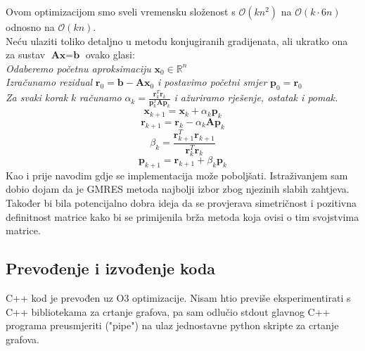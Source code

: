 \documentclass[zavrsnirad]{../fer}
\begin{document}
Ovom optimizacijom smo sveli vremensku složenost s 
$\mathcal{O}(k n^2)$ na $\mathcal{O}(k \cdot 6n)$ odnosno na $\mathcal{O}(k n)$.
\bigskip
\\
Neću ulaziti toliko detaljno u metodu konjugiranih gradijenata, 
ali ukratko ona za sustav $\textbf{A}\textbf{x} = \textbf{b}$ ovako glasi: 
\\ 
\textit{Odaberemo početnu aproksimaciju} $\textbf{x}_0 \in \mathbb{R}^n$
\\ 
\textit{Izračunamo rezidual} $\textbf{r}_0 = \textbf{b} - \textbf{A}\textbf{x}_0$
\textit{i postavimo početni smjer} $\textbf{p}_0 = \textbf{r}_0$ 
\\ 
\textit{Za svaki korak} $k$ \textit{računamo} $\alpha_k = 
\frac{\textbf{r}_k^T\textbf{r}_k}{\textbf{p}_k^T\textbf{A}\textbf{p}_k}$ 
\textit{i ažuriramo rješenje, ostatak i pomak.} 
$$\textbf{x}_{k+1} = \textbf{x}_k + \alpha_k \textbf{p}_k$$
$$\textbf{r}_{k + 1} = \textbf{r}_k - \alpha_k \textbf{A} \textbf{p}_k$$ 
$$\beta_k = \frac{\textbf{r}_{k + 1}^T\textbf{r}_{k + 1}}{\textbf{r}_k^T\textbf{r}_k} $$
$$\textbf{p}_{k + 1} = \textbf{r}_{k + 1} + \beta_k  \textbf{p}_k$$
Kao i prije navodim gdje se implementacija može poboljšati. Istraživanjem 
sam dobio dojam da je GMRES metoda najbolji izbor
zbog njezinih slabih zahtjeva. Također bi bila
potencijalno dobra 
ideja da se provjerava simetričnost i pozitivna definitnost matrice 
kako bi se primijenila brža metoda koja ovisi o tim svojstvima 
matrice.

\subsection{Prevođenje i izvođenje koda}
C++ kod je prevođen uz O3 optimizacije. Nisam htio 
previše eksperimentirati s C++ bibliotekama za crtanje grafova, pa 
sam odlučio stdout glavnog C++ programa preusmjeriti ("pipe")
na ulaz jednostavne python skripte za crtanje grafova.

\end{document}
